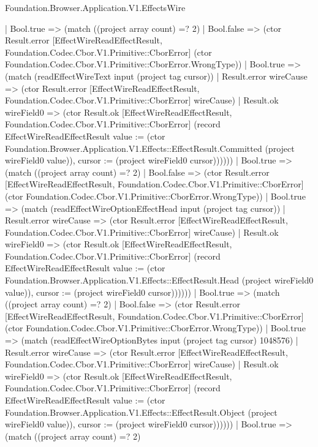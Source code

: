 \begin{lexlean}{Foundation.Browser.Application.V1.EffectsWire}
\begin{semanticmodule}
{                      | Bool.true => (match ((project array count) =? 2)
                        | Bool.false => (ctor Result.error [EffectWireReadEffectResult, Foundation.Codec.Cbor.V1.Primitive::CborError] (ctor Foundation.Codec.Cbor.V1.Primitive::CborError.WrongType))
                        | Bool.true => (match (readEffectWireText input (project tag cursor))
                          | Result.error wireCause => (ctor Result.error [EffectWireReadEffectResult, Foundation.Codec.Cbor.V1.Primitive::CborError] wireCause)
                          | Result.ok wireField0 => (ctor Result.ok [EffectWireReadEffectResult, Foundation.Codec.Cbor.V1.Primitive::CborError] (record EffectWireReadEffectResult {value := (ctor Foundation.Browser.Application.V1.Effects::EffectResult.Committed (project wireField0 value)), cursor := (project wireField0 cursor)})))))
                    | Bool.true => (match ((project array count) =? 2)
                      | Bool.false => (ctor Result.error [EffectWireReadEffectResult, Foundation.Codec.Cbor.V1.Primitive::CborError] (ctor Foundation.Codec.Cbor.V1.Primitive::CborError.WrongType))
                      | Bool.true => (match (readEffectWireOptionEffectHead input (project tag cursor))
                        | Result.error wireCause => (ctor Result.error [EffectWireReadEffectResult, Foundation.Codec.Cbor.V1.Primitive::CborError] wireCause)
                        | Result.ok wireField0 => (ctor Result.ok [EffectWireReadEffectResult, Foundation.Codec.Cbor.V1.Primitive::CborError] (record EffectWireReadEffectResult {value := (ctor Foundation.Browser.Application.V1.Effects::EffectResult.Head (project wireField0 value)), cursor := (project wireField0 cursor)})))))
                  | Bool.true => (match ((project array count) =? 2)
                    | Bool.false => (ctor Result.error [EffectWireReadEffectResult, Foundation.Codec.Cbor.V1.Primitive::CborError] (ctor Foundation.Codec.Cbor.V1.Primitive::CborError.WrongType))
                    | Bool.true => (match (readEffectWireOptionBytes input (project tag cursor) 1048576)
                      | Result.error wireCause => (ctor Result.error [EffectWireReadEffectResult, Foundation.Codec.Cbor.V1.Primitive::CborError] wireCause)
                      | Result.ok wireField0 => (ctor Result.ok [EffectWireReadEffectResult, Foundation.Codec.Cbor.V1.Primitive::CborError] (record EffectWireReadEffectResult {value := (ctor Foundation.Browser.Application.V1.Effects::EffectResult.Object (project wireField0 value)), cursor := (project wireField0 cursor)})))))
                | Bool.true => (match ((project array count) =? 2)
}
\end{semanticmodule}
\end{lexlean}
